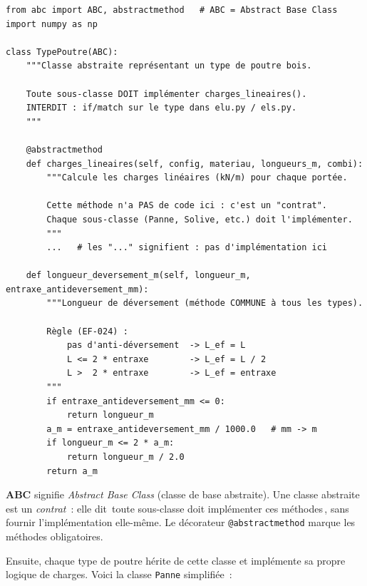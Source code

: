 \documentclass[12pt, a4paper, openany]{book}
\newcommand{\py}[1]{\texttt{#1}}
\newcommand{\fichier}[1]{\texttt{\textit{#1}}}
\begin{document}
\begin{lstlisting}[style=python, caption={Extrait de \fichier{types\_poutre/base.py} --- classe abstraite \py{TypePoutre}}]
from abc import ABC, abstractmethod   # ABC = Abstract Base Class
import numpy as np

class TypePoutre(ABC):
    """Classe abstraite représentant un type de poutre bois.

    Toute sous-classe DOIT implémenter charges_lineaires().
    INTERDIT : if/match sur le type dans elu.py / els.py.
    """

    @abstractmethod
    def charges_lineaires(self, config, materiau, longueurs_m, combi):
        """Calcule les charges linéaires (kN/m) pour chaque portée.

        Cette méthode n'a PAS de code ici : c'est un "contrat".
        Chaque sous-classe (Panne, Solive, etc.) doit l'implémenter.
        """
        ...   # les "..." signifient : pas d'implémentation ici

    def longueur_deversement_m(self, longueur_m, entraxe_antideversement_mm):
        """Longueur de déversement (méthode COMMUNE à tous les types).

        Règle (EF-024) :
            pas d'anti-déversement  -> L_ef = L
            L <= 2 * entraxe        -> L_ef = L / 2
            L >  2 * entraxe        -> L_ef = entraxe
        """
        if entraxe_antideversement_mm <= 0:
            return longueur_m
        a_m = entraxe_antideversement_mm / 1000.0   # mm -> m
        if longueur_m <= 2 * a_m:
            return longueur_m / 2.0
        return a_m
\end{lstlisting}

\begin{definition}
\textbf{ABC} signifie \emph{Abstract Base Class} (classe de base abstraite).
Une classe abstraite est un \emph{contrat}~: elle dit
\guillemotleft\,toute sous-classe doit impl\'ementer ces m\'ethodes\,\guillemotright,
sans fournir l'impl\'ementation elle-m\^eme.
Le d\'ecorateur \py{@abstractmethod} marque les m\'ethodes obligatoires.
\end{definition}

Ensuite, chaque type de poutre h\'erite de cette classe et impl\'emente
sa propre logique de charges. Voici la classe \py{Panne} simplifi\'ee~:
\end{document}
